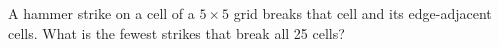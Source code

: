 A hammer strike on a cell of a $ 5\times5 $ grid breaks that cell and its edge-adjacent cells. What is the fewest strikes that break all 25 cells?

